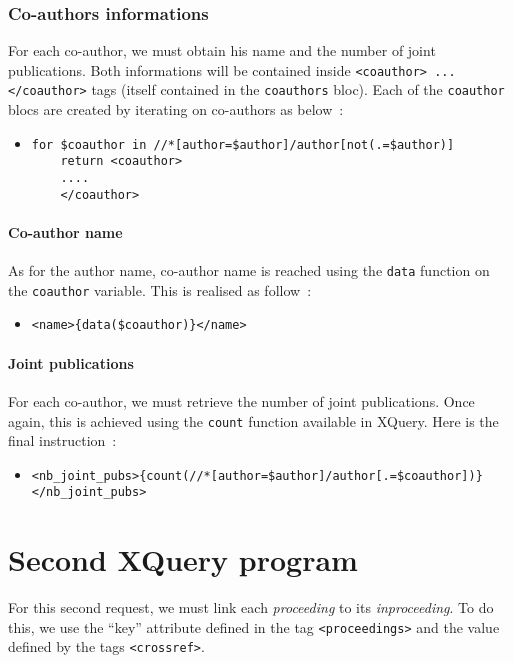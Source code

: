 \documentclass{article}
\begin{document}
    \subsubsection{Co-authors informations}
      For each co-author, we must obtain his name and the number of joint publications. Both informations will be contained inside \verb|<coauthor> ... </coauthor>| tags (itself contained in the \verb|coauthors| bloc). Each of the \verb|coauthor| blocs are created by iterating on co-authors as below~:
      \begin{itemize}
	\item \begin{verbatim}
for $coauthor in //*[author=$author]/author[not(.=$author)]
    return <coauthor>
    ....
    </coauthor>\end{verbatim}
      \end{itemize}
      
      \paragraph{Co-author name}
	As for the author name, co-author name is reached using the \verb|data| function on the \verb|coauthor| variable. This is realised as follow~:
	\begin{itemize}
	  \item \verb|<name>{data($coauthor)}</name>|
	\end{itemize}
	
      \paragraph{Joint publications}
	For each co-author, we must retrieve the number of joint publications. Once again, this is achieved using the \verb|count| function available in XQuery. Here is the final instruction~:
	\begin{itemize}
	  \item \verb|<nb_joint_pubs>{count(//*[author=$author]/author[.=$coauthor])}</nb_joint_pubs>|
	\end{itemize}


\section{Second XQuery program}
  For this second request, we must link each \textit{proceeding} to its \textit{inproceeding}. To do this, we use the ``key'' attribute defined in the tag \verb|<proceedings>| and the value defined by the tags \verb|<crossref>|.
  
\end{document}
